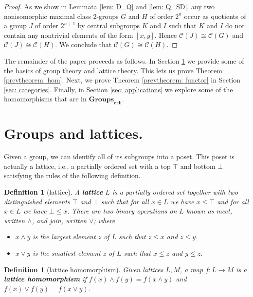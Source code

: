 \documentclass[12pt]{amsart}
\newtheorem{definition}[theorem]{Definition}
\begin{document}
\begin{proof}
    As we show in Lemmata \ref{lem: D_Q} and \ref{lem: Q_SD}, any two nonisomorphic maximal class 2-groups $G$ and $H$ of order $2^n$ occur as quotients of a group $J$ of order $2^{n+1}$ by central subgroups $K$ and $I$ such that $K$ and $I$ do not contain any nontrivial elements of the form $[x,y]$. Hence $\mathcal{C}(J)\cong \mathcal{C}(G)$ and $\mathcal{C}(J)\cong \mathcal{C}(H)$. We conclude that $\mathcal{C}(G)\cong \mathcal{C}(H)$.
\end{proof}

The remainder of the paper proceeds as follows. In Section \ref{sec: groups/lattices} we provide some of the basics of group theory and lattice theory. This lets us prove Theorem \ref{prevtheorem: hom}. Next, we %
prove Theorem \ref{prevtheorem: functor} in Section \ref{sec: categories}. Finally, in Section \ref{sec: applications} we explore some of the homomorphisms that are in $\mathbf{Groups}_{\mathbf{crh}}$. 

\section{Groups and lattices.}\label{sec: groups/lattices}

Given a group, we can identify all of its subgroups into a poset. This poset is actually a lattice, i.e., a partially ordered set with a top $\top$ and bottom $\bot$ satisfying the rules of the following definition.

\begin{definition}[lattice]
    A \textbf{lattice} $L$ is a partially ordered set together with two distinguished elements $\top$ and $\bot$ such that for all $x \in L$ we have $x\leq \top$ and for all $x\in L$ we have $\bot \leq x$. There are two binary operations on $L$ known as meet, written $\wedge$, and join, written $\vee$; where 
    \begin{itemize} 
    \item $x \wedge y$ is the largest element $z$ of $L$ such that $z \leq x$ and $z\leq y$.
    \item $x \vee y$ is the smallest element $z$ of $L$ such that $x\leq z$ and $y \leq z$. 
    \end{itemize}
\end{definition}

\begin{definition}[lattice homomorphism]
    Given lattices $L, M$, a map $f:L\rightarrow M$ is a \textbf{lattice homomorphism} if $f(x) \wedge f(y) = f(x\wedge y)$ and $f(x) \vee f(y) = f(x\vee y)$. 
\end{definition}
\end{document}
